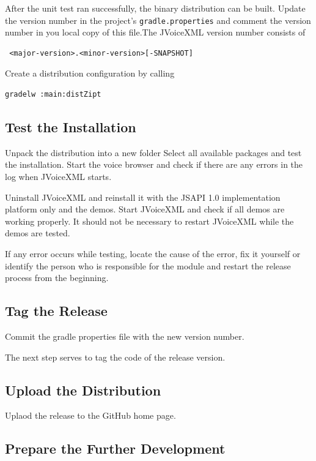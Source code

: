 \documentclass[11pt,a4paper]{article}
\begin{document}
After the unit test ran successfully, the binary distribution can be built.
Update the version number in the project's \texttt{gradle.properties}
and comment the version number in you local copy of this file.The JVoiceXML version number consists of
\begin{lstlisting}
 <major-version>.<minor-version>[-SNAPSHOT]
\end{lstlisting}

Create a distribution configuration by calling
\begin{lstlisting}
gradelw :main:distZipt
\end{lstlisting}

\subsection{Test the Installation}

Unpack the distribution into a new folder
Select all available packages and test the installation. 
Start the voice browser and check if there are any errors in the log when
JVoiceXML starts.

Uninstall JVoiceXML and reinstall it with the JSAPI 1.0 implementation platform
only and the demos. Start JVoiceXML and check if all demos are working properly.
It should not be necessary to restart JVoiceXML while the demos are tested.

If any error occurs while testing, locate the cause of the error, fix it
yourself or identify the person who is responsible for the module and restart
the release process from the beginning.

\subsection{Tag the Release}

Commit the gradle properties file with the new version number.

The next step serves to tag the code of the release version. 

\subsection{Upload the Distribution}

Uplaod the release to the GitHub home page.

\subsection{Prepare the Further Development}
\end{document}
